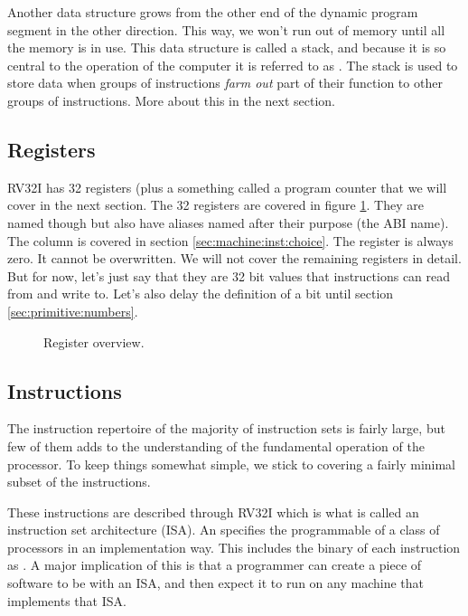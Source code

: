 Another data structure grows from the other end of the dynamic program segment in the other direction. This way, we won't run out of memory until all the memory is in use. This data structure is called a stack, and because it is so central to the operation of the computer it is referred to as . The stack is used to store data when groups of instructions \textsl{farm out} part of their function to other groups of instructions. More about this in the next section.

\subsection{Registers}

RV32I has 32 registers (plus a something called a program counter that we will cover in the next section. The 32 registers are covered in figure \ref{fig:machine:regs}. They are named  though  but also have aliases named after their purpose (the ABI name). The  column is covered in section \ref{sec:machine:inst:choice}. The  register is always zero. It cannot be overwritten. We will not cover the remaining registers in detail. But for now, let's just say that they are 32 bit values that instructions can read from and write to. Let's also delay the definition of a bit until section \ref{sec:primitive:numbers}.

\begin{figure}[tbp]
  
  \caption{Register overview.}
  \label{fig:machine:regs}
\end{figure}

\subsection{Instructions}

The instruction repertoire of the majority of instruction sets is fairly large, but few of them adds to the understanding of the fundamental operation of the processor. To keep things somewhat simple, we stick to covering a fairly minimal subset of the instructions.

These instructions are described through RV32I which is what is called an instruction set architecture (ISA). An  specifies the programmable  of a class of processors in an implementation  way. This includes the binary  of each instruction as . A major implication of this is that a programmer can create a piece of software to be  with an ISA, and then expect it to run on any machine that implements that ISA.

